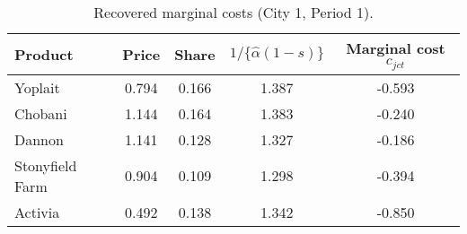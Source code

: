 \begin{table}[H]
\centering
\caption{Recovered marginal costs (City 1, Period 1).}
\label{tab:q7_mc_c1t1}
\begin{tabular}{lcccc}
\toprule
Product & Price & Share & $1/\{\hat\alpha(1-s)\}$ & Marginal cost $c_{jct}$ \\
\midrule
Yoplait & 0.794 & 0.166 & 1.387 & -0.593 \\
Chobani & 1.144 & 0.164 & 1.383 & -0.240 \\
Dannon & 1.141 & 0.128 & 1.327 & -0.186 \\
Stonyfield Farm & 0.904 & 0.109 & 1.298 & -0.394 \\
Activia & 0.492 & 0.138 & 1.342 & -0.850 \\
\bottomrule
\end{tabular}
\end{table}
